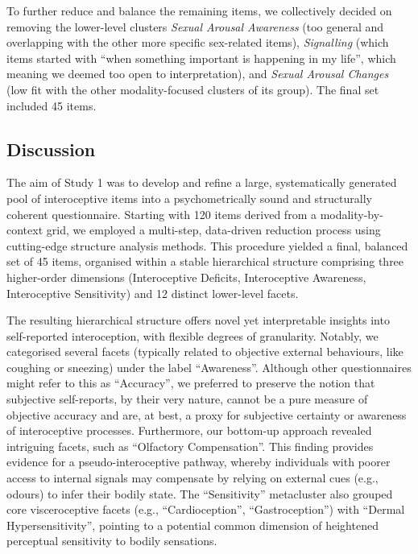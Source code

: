 \documentclass[
  jou,
  floatsintext,
  longtable,
  nolmodern,
  notxfonts,
  notimes,
  colorlinks=true,linkcolor=blue,citecolor=blue,urlcolor=blue]{apa7}
\begin{document}
To further reduce and balance the remaining items, we collectively
decided on removing the lower-level clusters \emph{Sexual Arousal
Awareness} (too general and overlapping with the other more specific
sex-related items), \emph{Signalling} (which items started with ``when
something important is happening in my life'', which meaning we deemed
too open to interpretation), and \emph{Sexual Arousal Changes} (low fit
with the other modality-focused clusters of its group). The final set
included 45 items.

\subsection{Discussion}\label{discussion}

The aim of Study 1 was to develop and refine a large, systematically
generated pool of interoceptive items into a psychometrically sound and
structurally coherent questionnaire. Starting with 120 items derived
from a modality-by-context grid, we employed a multi-step, data-driven
reduction process using cutting-edge structure analysis methods. This
procedure yielded a final, balanced set of 45 items, organised within a
stable hierarchical structure comprising three higher-order dimensions
(Interoceptive Deficits, Interoceptive Awareness, Interoceptive
Sensitivity) and 12 distinct lower-level facets.

The resulting hierarchical structure offers novel yet interpretable
insights into self-reported interoception, with flexible degrees of
granularity. Notably, we categorised several facets (typically related
to objective external behaviours, like coughing or sneezing) under the
label ``Awareness''. Although other questionnaires might refer to this
as ``Accuracy'', we preferred to preserve the notion that subjective
self-reports, by their very nature, cannot be a pure measure of
objective accuracy and are, at best, a proxy for subjective certainty or
awareness of interoceptive processes. Furthermore, our bottom-up
approach revealed intriguing facets, such as ``Olfactory Compensation''.
This finding provides evidence for a pseudo-interoceptive pathway,
whereby individuals with poorer access to internal signals may
compensate by relying on external cues (e.g., odours) to infer their
bodily state. The ``Sensitivity'' metacluster also grouped core
visceroceptive facets (e.g., ``Cardioception'', ``Gastroception'') with
``Dermal Hypersensitivity'', pointing to a potential common dimension of
heightened perceptual sensitivity to bodily sensations.
\end{document}
